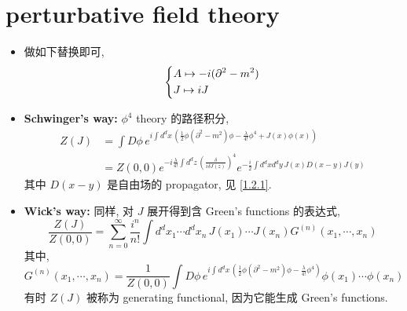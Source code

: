 \section{perturbative field theory}
\begin{itemize}
	\item 做如下替换即可,
	\begin{equation}
		\begin{dcases}
			A \mapsto - i (\partial^2 - m^2) \\
			J \mapsto i J
		\end{dcases}
	\end{equation}
	
	\item \textbf{Schwinger's way:} $\phi^4$ theory 的路径积分,
	\begin{align}
		Z(J) &= \int D\phi \, e^{i \int d^d x \, (\frac{1}{2} \phi (\partial^2 - m^2) \phi - \frac{\lambda}{4!} \phi^4 + J(x) \phi(x))} \\
		&= Z(0, 0) e^{- i \frac{\lambda}{4!} \int d^d z \, (\frac{\delta}{i \delta J(z)})^4} e^{- \frac{i}{2} \int d^d x d^d y \, J(x) D(x - y) J(y)}
	\end{align}
	其中 $D(x - y)$ 是自由场的 propagator, 见 \eqref{1.2.1}.
	
	\item \textbf{Wick's way:} 同样, 对 $J$ 展开得到含 Green's functions 的表达式,
	\begin{equation}
		\frac{Z(J)}{Z(0, 0)} = \sum_{n = 0}^\infty \frac{i^n}{n!} \int d^d x_1 \cdots d^d x_n \, J(x_1) \cdots J(x_n) G^{(n)}(x_1, \cdots, x_n)
	\end{equation}
	其中,
	\begin{equation} \label{4.3.5}
		G^{(n)}(x_1, \cdots, x_n) = \frac{1}{Z(0, 0)} \int D\phi \, e^{i \int d^d x \, (\frac{1}{2} \phi (\partial^2 - m^2) \phi - \frac{\lambda}{4!} \phi^4)} \phi(x_1) \cdots \phi(x_n)
	\end{equation}
	有时 $Z(J)$ 被称为 generating functional, 因为它能生成 Green's functions.
\end{itemize}

